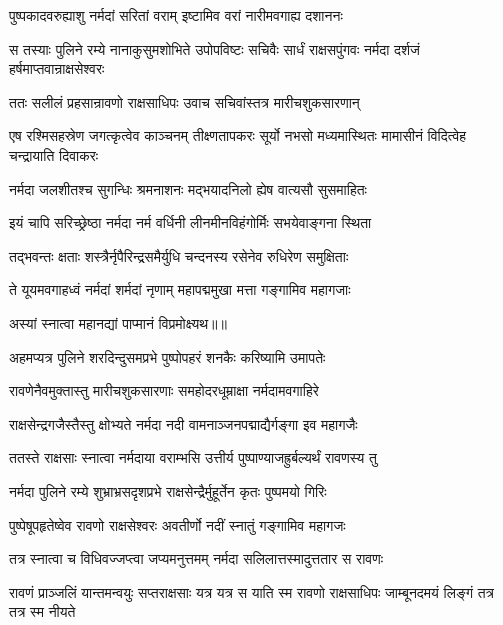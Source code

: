 \twolineshloka
{पुष्पकादवरुह्याशु नर्मदां सरितां वराम्}
{इष्टामिव वरां नारीमवगाह्य दशाननः} %

\threelineshloka
{स तस्याः पुलिने रम्ये नानाकुसुमशोभिते}
{उपोपविष्टः सचिवैः सार्धं राक्षसपुंगवः}
{नर्मदा दर्शजं हर्षमाप्तवान्राक्षसेश्वरः} %

\twolineshloka
{ततः सलीलं प्रहसान्रावणो राक्षसाधिपः}
{उवाच सचिवांस्तत्र मारीचशुकसारणान्} %

\threelineshloka
{एष रश्मिसहस्रेण जगत्कृत्वेव काञ्चनम्}
{तीक्ष्णतापकरः सूर्यो नभसो मध्यमास्थितः}
{मामासीनं विदित्वेह चन्द्रायाति दिवाकरः} %

\twolineshloka
{नर्मदा जलशीतश्च सुगन्धिः श्रमनाशनः}
{मद्भयादनिलो ह्येष वात्यसौ सुसमाहितः} %

\twolineshloka
{इयं चापि सरिच्छ्रेष्ठा नर्मदा नर्म वर्धिनी}
{लीनमीनविहंगोर्मिः सभयेवाङ्गना स्थिता} %

\twolineshloka
{तद्भवन्तः क्षताः शस्त्रैर्नृपैरिन्द्रसमैर्युधि}
{चन्दनस्य रसेनेव रुधिरेण समुक्षिताः} %

\twolineshloka
{ते यूयमवगाहध्वं नर्मदां शर्मदां नृणाम्}
{महापद्ममुखा मत्ता गङ्गामिव महागजाः} %

{अस्यां स्नात्वा महानद्यां पाप्मानं विप्रमोक्ष्यथ॥॥} %

\addtocounter{shlokacount}{1}

\twolineshloka
{अहमप्यत्र पुलिने शरदिन्दुसमप्रभे}
{पुष्पोपहरं शनकैः करिष्यामि उमापतेः} %

\twolineshloka
{रावणेनैवमुक्तास्तु मारीचशुकसारणाः}
{समहोदरधूम्राक्षा नर्मदामवगाहिरे} %

\twolineshloka
{राक्षसेन्द्रगजैस्तैस्तु क्षोभ्यते नर्मदा नदी}
{वामनाञ्जनपद्माद्यैर्गङ्गा इव महागजैः} %

\twolineshloka
{ततस्ते राक्षसाः स्नात्वा नर्मदाया वराम्भसि}
{उत्तीर्य पुष्पाण्याजह्रुर्बल्यर्थं रावणस्य तु} %

\twolineshloka
{नर्मदा पुलिने रम्ये शुभ्राभ्रसदृशप्रभे}
{राक्षसेन्द्रैर्मुहूर्तेन कृतः पुष्पमयो गिरिः} %

\twolineshloka
{पुष्पेषूपहृतेष्वेव रावणो राक्षसेश्वरः}
{अवतीर्णो नदीं स्नातुं गङ्गामिव महागजः} %

\twolineshloka
{तत्र स्नात्वा च विधिवज्जप्त्वा जप्यमनुत्तमम्}
{नर्मदा सलिलात्तस्मादुत्ततार स रावणः} %

\threelineshloka
{रावणं प्राञ्जलिं यान्तमन्वयुः सप्तराक्षसाः}
{यत्र यत्र स याति स्म रावणो राक्षसाधिपः}
{जाम्बूनदमयं लिङ्गं तत्र तत्र स्म नीयते} %


